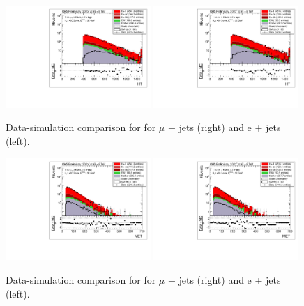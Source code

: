 \begin{figure}[ht!]
\centering
    \includegraphics[width=0.49\textwidth]{images/Run1/HT_SelectedJets_StackLogY_Mu.pdf}
     \includegraphics[width=0.49\textwidth]{images/Run1/HT_SelectedJets_StackLogY_e.pdf}          
    \caption{Data-simulation comparison for \HT for $\mu$ + jets (right) and e + jets (left). }
    \label{fig:datasimHT}
\end{figure}

\begin{figure}[ht!]
\centering
    \includegraphics[width=0.49\textwidth]{images/Run1/MET_StackLogY_Mu.pdf}
     \includegraphics[width=0.49\textwidth]{images/Run1/MET_StackLogY_e.pdf}          
    \caption{Data-simulation comparison for \MET for $\mu$ + jets (right) and e + jets (left). }
    \label{fig:datasimMET}
\end{figure}

